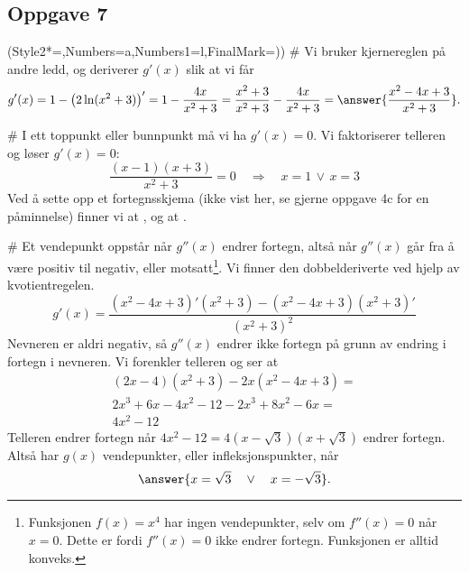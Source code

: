 \subsection*{Oppgave 7}
\begin{easylist}[enumerate]
	\ListProperties(Style2*=,Numbers=a,Numbers1=l,FinalMark={)})
	# Vi bruker kjernereglen på andre ledd, og deriverer $g'(x)$ slik at vi får
	\begin{equation*}
		g'(x) = 1 - \left(2\ln(x^2+3)\right)' = 1 - \frac{4x}{x^2+3} =
		\frac{x^2+3}{x^2+3} - \frac{4x}{x^2+3} = \answer{\frac{x^2-4x+3}{x^2+3}}.
	\end{equation*}


	# I ett toppunkt eller bunnpunkt må vi ha $g'(x) = 0$.
	Vi faktoriserer telleren og løser $g'(x) = 0$:
	\begin{equation*}
		\frac{(x-1)(x+3)}{x^2+3}= 0 
		\quad \Rightarrow \quad
		x= 1 \, \vee \, x= 3
	\end{equation*}
	Ved å sette opp et fortegnsskjema (ikke vist her, se gjerne oppgave 4c for en påminnelse) finner vi at , og at .
	
	
	# Et vendepunkt oppstår når $g''(x)$ endrer fortegn, altså når $g''(x)$ går fra å være positiv til negativ, eller motsatt\footnote{Funksjonen $f(x) = x^4$ har ingen vendepunkter, selv om $f''(x) = 0$ når $x=0$. Dette er fordi $f''(x) = 0$ ikke endrer fortegn. Funksjonen er alltid konveks.}.
	Vi finner den dobbelderiverte ved hjelp av kvotientregelen.
	\begin{equation*}
		g'(x)	= \frac{\left(x^2-4x+3\right)'\left(x^2+3\right)-\left(x^2-4x+3\right)\left(x^2+3\right)'}{\left(x^2+3\right)^2}
	\end{equation*}
	Nevneren er aldri negativ, så $g''(x)$ endrer ikke fortegn på grunn av endring i fortegn i nevneren.
	Vi forenkler telleren og ser at
	\begin{gather*}
		(2x-4)(x^2+3)-2x(x^2-4x+3) = \\
		2x^3+6x-4x^2-12-2x^3+8x^2-6x = \\
		4x^2 - 12
	\end{gather*}
	Telleren endrer fortegn når $4x^2 - 12 = 4(x - \sqrt{3})(x + \sqrt{3})$ endrer fortegn.
	Altså har $g(x)$ vendepunkter, eller infleksjonspunkter, når
	\begin{equation*}
		\answer{x = \sqrt{3} \quad \vee \quad x=-\sqrt{3}}.
	\end{equation*}

\end{easylist}


